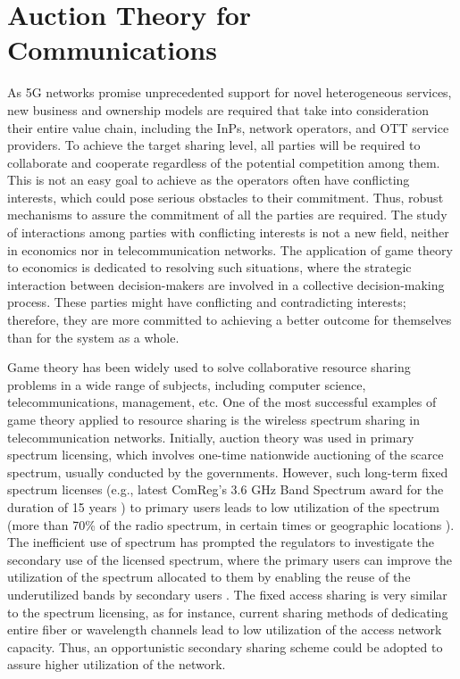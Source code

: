 \section{Auction Theory for Communications}
\label{Back:Sec:auction}
As \ac{5G} networks promise unprecedented support for novel heterogeneous services, new business and ownership models are required that take into consideration their entire value chain, including the \acp{InP}, network operators, and \ac{OTT} service providers. To achieve the target sharing level, all parties will be required to collaborate and cooperate regardless of the potential competition among them. This is not an easy goal to achieve as the operators often have conflicting interests, which could pose serious obstacles to their commitment. Thus, robust mechanisms to assure the commitment of all the parties are required. 
The study of interactions among parties with conflicting interests is not a new field, neither in economics nor in telecommunication networks. The application of game theory to economics is dedicated to resolving such situations, where the strategic interaction between decision-makers are involved in a collective decision-making process. These parties might have conflicting and contradicting interests; therefore, they are more committed to achieving a better outcome for themselves than for the system as a whole. 

Game theory has been widely used to solve collaborative resource sharing problems in a wide range of subjects, including computer science, telecommunications, management, etc. One of the most successful examples of game theory applied to resource sharing is the wireless spectrum sharing in telecommunication networks. %
Initially, auction theory was used in primary spectrum licensing, which involves one-time nationwide auctioning of the scarce spectrum, usually conducted by the governments. However, such long-term fixed spectrum licenses (e.g., latest ComReg's 3.6 GHz Band Spectrum award for the duration of 15 years \cite{comreg_spectrum}) to primary users leads to low utilization of the spectrum (more than 70\% of the radio spectrum, in certain times or geographic locations \cite{mishra2016qos}). The inefficient use of spectrum has prompted the regulators to investigate the secondary use of the licensed spectrum, where the primary users can improve the utilization of the spectrum allocated to them by enabling the reuse of the underutilized bands by secondary users \cite{4481338}. 
The fixed access sharing is very similar to the spectrum licensing, as for instance, current sharing methods of dedicating entire fiber or wavelength channels lead to low utilization of the access network capacity. Thus, an opportunistic secondary sharing scheme could be adopted to assure higher utilization of the network.


